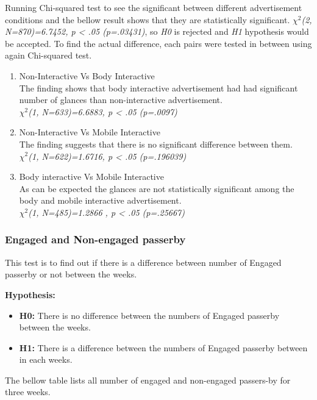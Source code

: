 Running Chi-squared test to see the significant between different advertisement conditions and the bellow result shows that they are statistically significant.
${\chi}^2$\emph{(2, N=870)=6.7452, p < .05 (p=.03431)}, so \emph{H0} is rejected and \emph{H1} hypothesis would be accepted.
To find the actual difference, each pairs were tested in between using again Chi-squared test.

\begin{enumerate}
\item Non-Interactive Vs Body Interactive \\
The finding shows that body interactive advertisement had had significant number of glances than non-interactive advertisement. \\
${\chi}^2$\emph{(1, N=633)=6.6883, p < .05 (p=.0097)}

\item Non-Interactive Vs Mobile Interactive  \\
The finding suggests that there is no significant difference between them.\\
${\chi}^2$\emph{(1, N=622)=1.6716, p < .05 (p=.196039)}

\item Body interactive Vs Mobile Interactive \\
As can be expected the glances are not statistically significant among the body and mobile interactive advertisement.\\
${\chi}^2$\emph{(1, N=485)=1.2866 , p < .05 (p=.25667)}

\end{enumerate}


\subsubsection {Engaged and Non-engaged passerby}
This test is to find out if there is a difference between number of Engaged passerby or not between the weeks.

\textbf{Hypothesis: }
\begin{itemize}
\item \textbf{H0:} There is no difference between the numbers of Engaged passerby between the weeks.
\item \textbf{H1:} There is a difference between the numbers of Engaged passerby between in each weeks.
\end{itemize}

The bellow table lists all number of engaged and non-engaged passers-by for three weeks.


